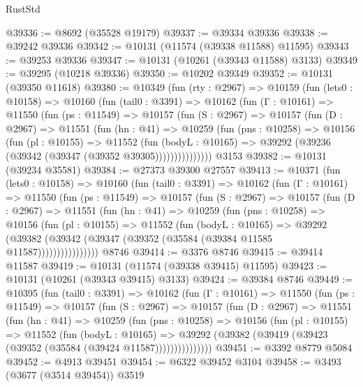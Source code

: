 \begin{lexlean}{RustStd}
\begin{coremodule}
@39336 := @8692 (@35528 @19179)
@39337 := @39334 @39336
@39338 := @39242 @39336
@39342 := @10131 (@11574 (@39338 @11588) @11595)
@39343 := @39253 @39336
@39347 := @10131 (@10261 (@39343 @11588) @3133)
@39349 := @39295 (@10218 @39336)
@39350 := @10202 @39349
@39352 := @10131 (@39350 @11618)
@39380 := @10349
    (fun (rty : @2967) =>
    @10159
      (fun (lets0 : @10158) =>
      @10160
        (fun (tail0 : @3391) =>
        @10162
          (fun (Γ : @10161) =>
          @11550
            (fun (ps : @11549) =>
            @10157
              (fun (S : @2967) =>
              @10157
                (fun (D : @2967) =>
                @11551
                  (fun (hn : @41) =>
                  @10259
                    (fun (pns : @10258) =>
                    @10156
                      (fun (pl : @10155) =>
                      @11552
                        (fun (bodyL : @10165) =>
                        @39292 (@39236 (@39342 (@39347 (@39352 @39305)))))))))))))))
    @3153
@39382 := @10131 (@39234 @35581)
@39384 := @27373 @39300 @27557
@39413 := @10371
    (fun (lets0 : @10158) =>
    @10160
      (fun (tail0 : @3391) =>
      @10162
        (fun (Γ : @10161) =>
        @11550
          (fun (ps : @11549) =>
          @10157
            (fun (S : @2967) =>
            @10157
              (fun (D : @2967) =>
              @11551
                (fun (hn : @41) =>
                @10259
                  (fun (pns : @10258) =>
                  @10156
                    (fun (pl : @10155) =>
                    @11552
                      (fun (bodyL : @10165) =>
                      @39292
                        (@39382
                          (@39342 (@39347 (@39352 (@35584 (@39384 @11585 @11587))))))))))))))))
    @8746
@39414 := @3376 @8746
@39415 := @39414 @11587
@39419 := @10131 (@11574 (@39338 @39415) @11595)
@39423 := @10131 (@10261 (@39343 @39415) @3133)
@39424 := @39384 @8746
@39449 := @10395
    (fun (tail0 : @3391) =>
    @10162
      (fun (Γ : @10161) =>
      @11550
        (fun (ps : @11549) =>
        @10157
          (fun (S : @2967) =>
          @10157
            (fun (D : @2967) =>
            @11551
              (fun (hn : @41) =>
              @10259
                (fun (pns : @10258) =>
                @10156
                  (fun (pl : @10155) =>
                  @11552
                    (fun (bodyL : @10165) =>
                    @39292 (@39382 (@39419 (@39423 (@39352 (@35584 (@39424 @11587)))))))))))))))
@39451 := @3392 @8779 @5084
@39452 := @4913 @39451
@39454 := @6322 @39452 @3104
@39458 := @3493 (@3677 (@3514 @39454)) @3519

\end{coremodule}
\end{lexlean}
